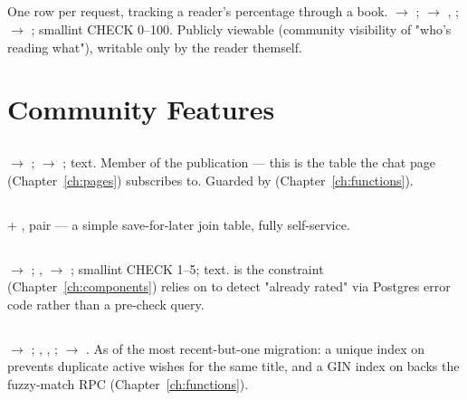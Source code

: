 \subsection*{}
One row per request, tracking a reader's percentage through a book.  $\to$ ;  $\to$ , ;  $\to$ ;  smallint CHECK 0--100. Publicly viewable (community visibility of "who's reading what"), writable only by the reader themself.

\section{Community Features}

\subsection*{}
 $\to$ ;  $\to$ ;  text. Member of the  publication — this is the table the chat page (Chapter~\ref{ch:pages}) subscribes to. Guarded by  (Chapter~\ref{ch:functions}).

\subsection*{}
 + ,  pair — a simple save-for-later join table, fully self-service.

\subsection*{}
 $\to$ ; ,  $\to$ ;  smallint CHECK 1--5;  text.  is the constraint  (Chapter~\ref{ch:components}) relies on to detect "already rated" via Postgres error code  rather than a pre-check query.

\subsection*{}
 $\to$ ; , , ;  $\to$  . As of the most recent-but-one migration: a unique index on  prevents duplicate active wishes for the same title, and a  GIN index on  backs the fuzzy-match RPC (Chapter~\ref{ch:functions}).

